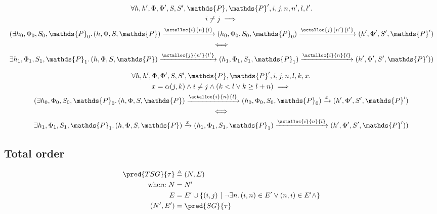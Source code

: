 \lem
\begin{gather*}
	\forall h, h', \Phi, \Phi', S, S', \mathds{P}, \mathds{P}', i, j, n, n', l, l' \ldotp \\
	i \neq j \implies \\
	(\exists h_0, \Phi_0, S_0, \mathds{P}_0 \ldotp 
	(h, \Phi, S, \mathds{P}) \xrightarrow{\actalloc{i}{n}{l}} (h_0, \Phi_0, S_0, \mathds{P}_0)  \xrightarrow{\actalloc{j}{n'}{l'}} (h', \Phi', S', \mathds{P}') \\
	\iff \\
	\exists h_1, \Phi_1, S_1, \mathds{P}_1 \ldotp
	(h, \Phi, S, \mathds{P}) \xrightarrow{\actalloc{j}{n'}{l'}} (h_1, \Phi_1, S_1, \mathds{P}_1) \xrightarrow{\actalloc{i}{n}{l}} (h', \Phi', S', \mathds{P}'))
\end{gather*}

\lem
\begin{gather*}
	\forall h, h', \Phi, \Phi', S, S', \mathds{P}, \mathds{P}', i, j, n, l, k, x \ldotp \\
	x = \alpha(j, k) \land i \neq j \land (k < l \lor k \geq l + n) \implies \\
	(\exists h_0, \Phi_0, S_0, \mathds{P}_0 \ldotp 
	(h, \Phi, S, \mathds{P}) \xrightarrow{\actalloc{i}{n}{l}} (h_0, \Phi_0, S_0, \mathds{P}_0)  \xrightarrow{x} (h', \Phi', S', \mathds{P}') \\
	\iff \\
	\exists h_1, \Phi_1, S_1, \mathds{P}_1 \ldotp
	(h, \Phi, S, \mathds{P}) \xrightarrow{x} (h_1, \Phi_1, S_1, \mathds{P}_1) \xrightarrow{\actalloc{i}{n}{l}} (h', \Phi', S', \mathds{P}'))
\end{gather*}

\subsection{Total order}

\begin{align*}
	\pred{TSG}{\tau} &\triangleq (N, E) \\
	\text{where } N &= N' \\
	E &= E' \cup \{ (i, j)\ |\ \lnot \exists n \ldotp (i, n) \in E' \lor (n, i) \in E' \land  \} \\
	(N', E') &= \pred{SG}{\tau}
\end{align*}
